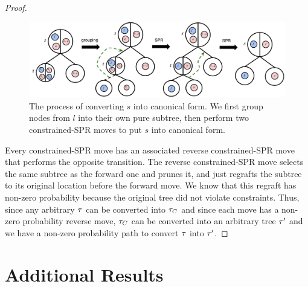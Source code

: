 \begin{proof}
\begin{figure}
    \centering
    \includegraphics[width=\textwidth]{img/ibhc/CanonicalTree}
    \caption{The process of converting $s$ into canonical form.
    We first group nodes from $l$ into their own pure subtree, then perform
    two constrained-SPR moves to put $s$ into canonical form.}
    \label{fig:supcanonical}
\end{figure}

Every constrained-SPR move has an associated reverse constrained-SPR move that
performs the opposite transition.
The reverse constrained-SPR move selects the same subtree as the forward one
and prunes it, and just regrafts the subtree to its original location
before the forward move.
We know that this regraft has non-zero probability because the original tree
did not violate constraints.
Thus, since any arbitrary $\tau$ can be converted into $\tau_C$ and since each move
has a non-zero probability reverse move,
$\tau_C$ can be converted into an arbitrary tree $\tau'$ and we have a non-zero probability
path to convert $\tau$ into $\tau'$.

\end{proof}

\section{Additional Results}

